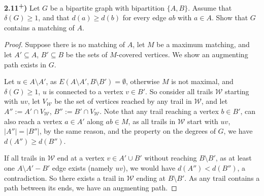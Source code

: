 \documentclass[11pt]{article}
\theoremstyle{plain}
\begin{document}
\textbf{2.11\textsuperscript{+})} Let $G$ be a bipartite graph with bipartition $\{A,B\}$. Assume that $\delta(G) \geq 1$, and that $d(a) \geq d(b)$ for every edge $ab$ with $a \in A$. Show that $G$ contains a matching of $A$.

\begin{proof}
Suppose there is no matching of $A$, let $M$ be a maximum matching, and let $A' \subseteq A$, $B' \subseteq B$ be the sets of $M$-covered vertices. We show an augmenting path exists in $G$.

Let $u \in A\setminus A'$, as $E(A \setminus A',B \setminus B') = \emptyset$, otherwise $M$ is not maximal, and $\delta(G) \geq 1$, $u$ is connected to a vertex $v \in B'$. So consider all trails $\mathcal{W}$ starting with $uv$, let $V_{\mathcal{W}}$ be the set of vertices reached by any trail in $\mathcal{W}$, and let $A'' := A'\cap V_{\mathcal{W}}$, $B'':=B' \cap V_{\mathcal{W}}$. Note that any trail reaching a vertex $b\in B'$, can also reach a vertex $a \in A'$ along $ab \in M$, as all trails in $\mathcal{W}$ start with $uv$, $|A''| = |B''|$, by the same reason, and the property on the degrees of $G$, we have $d(A'') \geq d(B'')$. 

If all trails in $\mathcal{W}$ end at a vertex $v \in A' \cup B'$ without reaching $B\setminus B'$, as at least one $A\setminus A'-B'$ edge exists (namely $uv$), we would have $d(A'') < d(B'')$, a contradiction. So there exists a trail in $\mathcal{W}$ ending at $B\setminus B'$. As any trail contains a path between its ends, we have an augmenting path.

%
%
%
%

\end{proof}
\end{document}
